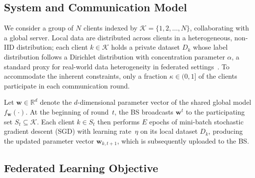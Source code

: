 \documentclass[journal]{IEEEtran}
\begin{document}
\subsection{System and Communication Model}

We consider a group of $N$ clients indexed by $\mathcal{K} = \{1, 2, \ldots, N\}$, collaborating with a global server. Local data are distributed across clients in a heterogeneous, non-IID distribution; each client $k \in \mathcal{K}$ holds a private dataset $D_k$ whose label distribution follows a Dirichlet distribution with concentration parameter $\alpha$, a standard proxy for real-world data heterogeneity in federated settings~\cite{hsieh2020non}. To accommodate the inherent constraints, only a fraction $\kappa \in (0, 1]$ of the clients participate in each communication round.

Let $\mathbf{w} \in \mathbb{R}^d$ denote the $d$-dimensional parameter vector of the shared global model $f_{\mathbf{w}}(\cdot)$. At the beginning of round~$t$, the BS broadcasts $\mathbf{w}^t$ to the participating set $S_t \subseteq \mathcal{K}$. Each client $k \in S_t$ then performs $E$ epochs of mini-batch stochastic gradient descent (SGD) with learning rate~$\eta$ on its local dataset $D_k$, producing the updated parameter vector $\mathbf{w}_{k,t+1}$, which is subsequently uploaded to the BS.

\subsection{Federated Learning Objective}
\end{document}
